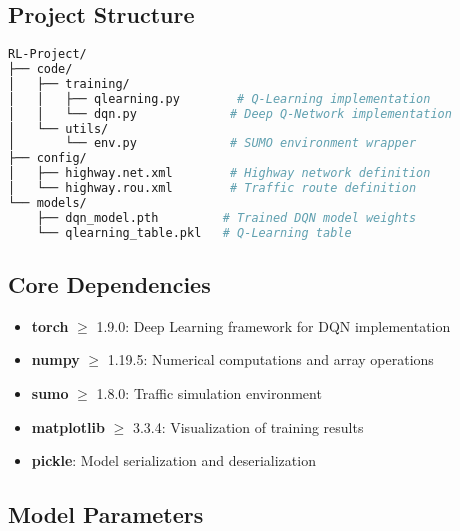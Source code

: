 \documentclass[a4paper, 12pt]{article}
\begin{document}
\subsection{Project Structure}
\begin{lstlisting}[language=bash]
RL-Project/
├── code/
│   ├── training/
│   │   ├── qlearning.py        # Q-Learning implementation
│   │   └── dqn.py             # Deep Q-Network implementation
│   └── utils/
│       └── env.py             # SUMO environment wrapper
├── config/
│   ├── highway.net.xml        # Highway network definition
│   └── highway.rou.xml        # Traffic route definition
└── models/
    ├── dqn_model.pth         # Trained DQN model weights
    └── qlearning_table.pkl   # Q-Learning table
\end{lstlisting}

\subsection{Core Dependencies}
\begin{tcolorbox}[title=Required Packages]
\begin{itemize}
    \item \textbf{torch} $\geq$ 1.9.0: Deep Learning framework for DQN implementation
    \item \textbf{numpy} $\geq$ 1.19.5: Numerical computations and array operations
    \item \textbf{sumo} $\geq$ 1.8.0: Traffic simulation environment
    \item \textbf{matplotlib} $\geq$ 3.3.4: Visualization of training results
    \item \textbf{pickle}: Model serialization and deserialization
\end{itemize}
\end{tcolorbox}

\subsection{Model Parameters}
\end{document}
